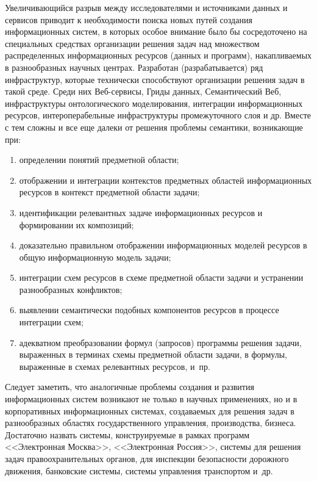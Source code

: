 \begin{multicols}{2}
     Увеличивающийся разрыв между исследователями и источниками данных и
сервисов приводит к необходимости поиска новых путей создания информационных
систем, в которых особое внимание было бы сосредоточено на специальных средствах
организации решения задач над множеством распределенных информационных ресурсов
(данных и программ), накапливаемых в разнообразных научных центрах. Разработан
(разрабатывается) ряд инфраструктур, которые технически способствуют организации
решения задач в такой среде. Среди них Веб-сервисы, Гриды данных, Семантический Веб,
инфраструктуры онтологического моделирования, интеграции информационных ресурсов,
интероперабельные инфраструктуры промежуточного слоя и др. Вместе с тем сложны и
все еще далеки от решения проблемы семантики, возникающие при:
     \begin{enumerate}[(1)]
\item определении понятий предметной области;
\item отображении и интеграции контекстов предметных областей информационных
ресурсов в контекст предметной области задачи;
\item идентификации релевантных задаче информационных ресурсов и формировании
их композиций;
\item доказательно правильном отображении информационных моделей ресурсов в
общую информационную модель задачи;
\item  интеграции схем ресурсов в схеме предметной области задачи и устранении
разнообразных конфликтов;
\item выявлении семантически подобных компонентов ресурсов в процессе
интеграции схем;
\item адекватном преобразовании формул (запросов) программы решения задачи,
выраженных в терминах схемы предметной области задачи, в формулы, выраженные в
схемах релевантных ресурсов, и~пр.
\end{enumerate}

     Следует заметить, что аналогичные проблемы создания и развития информационных
систем возникают не только в научных применениях, но и в корпоративных
информационных системах, создаваемых для решения задач в разнообразных областях
государственного управления, производства, бизнеса. Достаточно назвать системы,
конструируемые в рамках программ <<Электронная Москва>>, <<Электронная Россия>>,
системы для решения задач правоохранительных органов, для инспекции безопас\-ности
дорожного движения, банковские %
сис\-те\-мы, сис\-те\-мы управления транспортом и~др.\\[-12pt]


\end{multicols}
